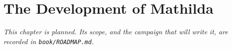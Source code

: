 \chapter{The Development of Mathilda}
\label{ch:development}

\emph{This chapter is planned. Its scope, and the campaign that will write
it, are recorded in \texttt{book/ROADMAP.md}.}
